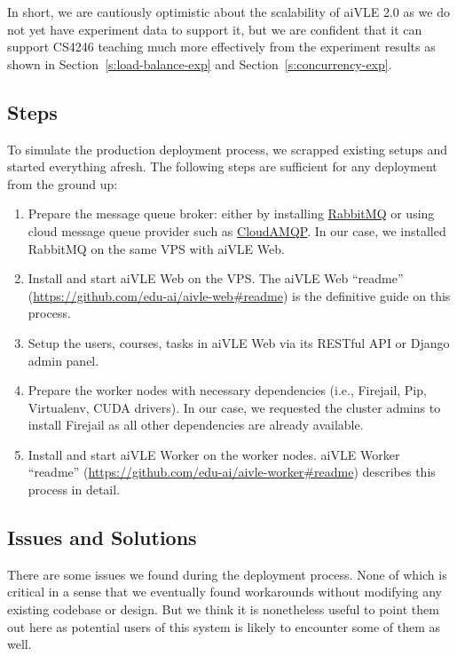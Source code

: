 In short, we are cautiously optimistic about the scalability of aiVLE 2.0 as we do not yet have experiment data to support it, but we are confident that it can support CS4246 teaching much more effectively from the experiment results as shown in Section~\ref{s:load-balance-exp} and Section~\ref{s:concurrency-exp}.

\subsection{Steps}
To simulate the production deployment process, we scrapped existing setups and started everything afresh. The following steps are sufficient for any deployment from the ground up:

\begin{enumerate}
    \item Prepare the message queue broker: either by installing \href{https://www.rabbitmq.com/}{RabbitMQ} or using cloud message queue provider such as \href{https://www.cloudamqp.com/}{CloudAMQP}. In our case, we installed RabbitMQ on the same VPS with aiVLE Web.
    \item Install and start aiVLE Web on the VPS.  The aiVLE Web ``readme'' (\href{https://github.com/edu-ai/aivle-web#readme}{https://github.com/edu-ai/aivle-web\#readme}) is the definitive guide on this process.
    \item Setup the users, courses, tasks in aiVLE Web via its RESTful API or Django admin panel.
    \item Prepare the worker nodes with necessary dependencies (i.e., Firejail, Pip, Virtualenv, CUDA drivers). In our case, we requested the cluster admins to install Firejail as all other dependencies are already available.
    \item Install and start aiVLE Worker on the worker nodes. aiVLE Worker ``readme'' (\href{https://github.com/edu-ai/aivle-worker#readme}{https://github.com/edu-ai/aivle-worker\#readme}) describes this process in detail.
\end{enumerate}

\subsection{Issues and Solutions}
There are some issues we found during the deployment process. None of which is critical in a sense that we eventually found workarounds without modifying any existing codebase or design. But we think it is nonetheless useful to point them out here as potential users of this system is likely to encounter some of them as well.

